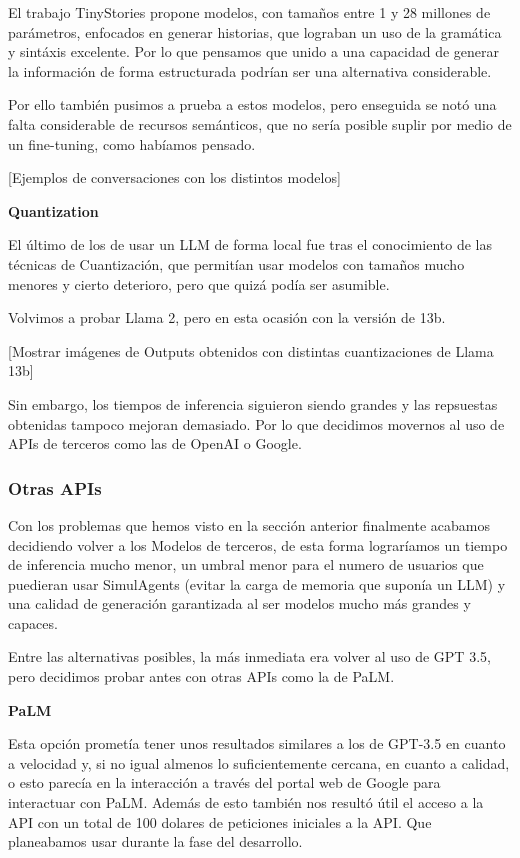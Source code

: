 El trabajo TinyStories \cite{eldan2023tinystories} propone modelos, con tamaños entre 1 y 28 millones de parámetros, enfocados en generar historias, que lograban un uso de la gramática y sintáxis excelente. Por lo que pensamos que unido a una capacidad de generar la información de forma estructurada podrían ser una alternativa considerable.

Por ello también pusimos a prueba a estos modelos, pero enseguida se notó una falta considerable de recursos semánticos, que no sería posible suplir por medio de un fine-tuning, como habíamos pensado.

[Ejemplos de conversaciones con los distintos modelos]

 \textbf{Quantization}

El último de los de usar un LLM de forma local fue tras el conocimiento de las técnicas de Cuantización, que permitían usar modelos con tamaños mucho menores y cierto deterioro, pero que quizá podía ser asumible.

Volvimos a probar Llama 2, pero en esta ocasión con la versión de 13b.

[Mostrar imágenes de Outputs obtenidos con distintas cuantizaciones de Llama 13b]

Sin embargo, los tiempos de inferencia siguieron siendo grandes y las repsuestas obtenidas tampoco mejoran demasiado. Por lo que decidimos movernos al uso de APIs de terceros como las de OpenAI o Google.

\subsubsection{Otras APIs}

Con los problemas que hemos visto en la sección anterior finalmente acabamos decidiendo volver a los Modelos de terceros, de esta forma lograríamos un tiempo de inferencia mucho menor, un umbral menor para el numero de usuarios que puedieran usar SimulAgents (evitar la carga de memoria que suponía un LLM) y una calidad de generación garantizada al ser modelos mucho más grandes y capaces.

Entre las alternativas posibles, la más inmediata era volver al uso de GPT 3.5, pero decidimos probar antes con otras APIs como la de PaLM.

\textbf{PaLM}

Esta opción prometía tener unos resultados similares a los de GPT-3.5 en cuanto a velocidad y, si no igual almenos lo suficientemente cercana, en cuanto a calidad, o esto parecía en la interacción a través del portal web de Google para interactuar con PaLM. Además de esto también nos resultó útil el acceso a la API con un total de 100 dolares de peticiones iniciales a la API. Que planeabamos usar durante la fase del desarrollo.

